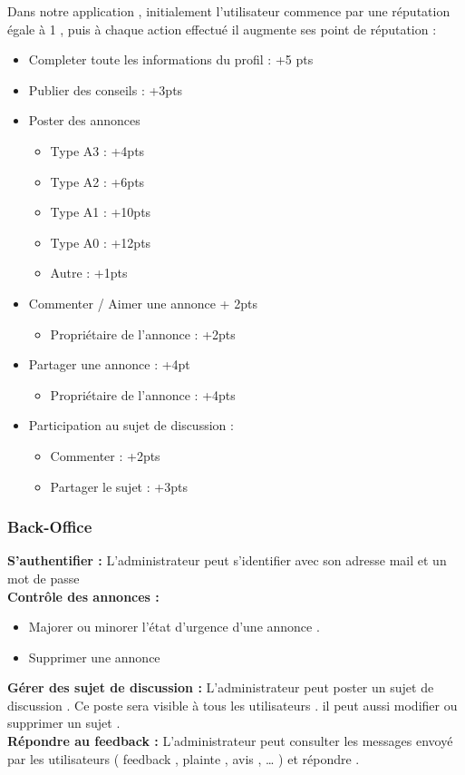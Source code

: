 \documentclass[11pt,a4paper,oneside]{book}
\begin{document}
	Dans notre application , initialement l’utilisateur commence par une réputation égale à 1 , puis à chaque action effectué il augmente ses point de réputation : 
	\begin{itemize}
		\item Completer toute les informations du profil : +5 pts
		\item Publier des conseils : +3pts
		\item Poster des annonces 
		\begin{itemize}
			\item Type A3 : +4pts
			\item Type A2 : +6pts 
			\item Type A1 : +10pts 
			\item Type A0 : +12pts
			\item Autre : +1pts
		\end{itemize}
		\item Commenter / Aimer une annonce + 2pts
		\begin{itemize}
			\item Propriétaire de l’annonce : +2pts
		\end{itemize}
		\item Partager une annonce : +4pt
		\begin{itemize}
			\item Propriétaire de l’annonce : +4pts
		\end{itemize}
		\item Participation au sujet de discussion :
		\begin{itemize}
			\item Commenter : +2pts
			\item Partager le sujet : +3pts
		\end{itemize}
	\end{itemize}
	\subsubsection{Back-Office}
	\textbf{S’authentifier :} L’administrateur peut s’identifier avec son adresse mail et un mot de passe\\
	\textbf{Contrôle des annonces :}
	\begin{itemize}
		\item Majorer ou minorer l'état d’urgence d’une annonce .
		\item Supprimer une annonce
	\end{itemize}
	\textbf{Gérer des sujet de discussion :} L’administrateur peut poster un sujet de discussion . Ce poste sera visible à tous les utilisateurs . il peut aussi modifier ou supprimer un sujet .\\
	\textbf{Répondre au feedback :} L’administrateur peut consulter les messages envoyé par les utilisateurs ( feedback , plainte , avis , … ) et répondre .
\end{document}
